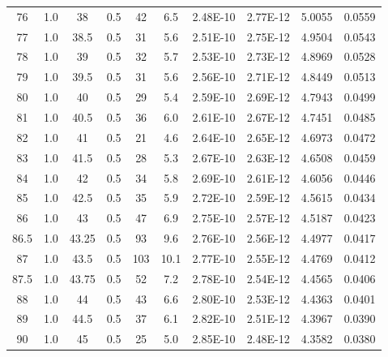 \documentclass[justified]{tufte-book}
\begin{document}
\begin{table}[ht]
\begin{tabular}{cccccccccc}
76        & 1.0 & 38       & 0.5         & 42    & 6.5      & 2.48E-10      & 2.77E-12         & 5.0055       & 0.0559 \\
77        & 1.0 & 38.5     & 0.5         & 31    & 5.6      & 2.51E-10      & 2.75E-12         & 4.9504       & 0.0543 \\
78        & 1.0 & 39       & 0.5         & 32    & 5.7      & 2.53E-10      & 2.73E-12         & 4.8969       & 0.0528 \\
79        & 1.0 & 39.5     & 0.5         & 31    & 5.6      & 2.56E-10      & 2.71E-12         & 4.8449       & 0.0513 \\
80        & 1.0 & 40       & 0.5         & 29    & 5.4      & 2.59E-10      & 2.69E-12         & 4.7943       & 0.0499 \\
81        & 1.0 & 40.5     & 0.5         & 36    & 6.0      & 2.61E-10      & 2.67E-12         & 4.7451       & 0.0485 \\
82        & 1.0 & 41       & 0.5         & 21    & 4.6      & 2.64E-10      & 2.65E-12         & 4.6973       & 0.0472 \\
83        & 1.0 & 41.5     & 0.5         & 28    & 5.3      & 2.67E-10      & 2.63E-12         & 4.6508       & 0.0459 \\
84        & 1.0 & 42       & 0.5         & 34    & 5.8      & 2.69E-10      & 2.61E-12         & 4.6056       & 0.0446 \\
85        & 1.0 & 42.5     & 0.5         & 35    & 5.9      & 2.72E-10      & 2.59E-12         & 4.5615       & 0.0434 \\
86        & 1.0 & 43       & 0.5         & 47    & 6.9      & 2.75E-10      & 2.57E-12         & 4.5187       & 0.0423 \\
86.5        & 1.0 & 43.25    & 0.5         & 93    & 9.6      & 2.76E-10      & 2.56E-12         & 4.4977       & 0.0417 \\
87        & 1.0 & 43.5     & 0.5         & 103   & 10.1     & 2.77E-10      & 2.55E-12         & 4.4769       & 0.0412 \\
87.5        & 1.0 & 43.75    & 0.5         & 52    & 7.2      & 2.78E-10      & 2.54E-12         & 4.4565       & 0.0406 \\
88        & 1.0 & 44       & 0.5         & 43    & 6.6      & 2.80E-10      & 2.53E-12         & 4.4363       & 0.0401 \\
89        & 1.0 & 44.5     & 0.5         & 37    & 6.1      & 2.82E-10      & 2.51E-12         & 4.3967       & 0.0390 \\
90        & 1.0 & 45       & 0.5         & 25    & 5.0      & 2.85E-10      & 2.48E-12         & 4.3582       & 0.0380 \\

\end{tabular}
\end{table}
\end{document}
